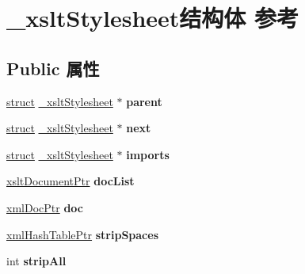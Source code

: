 \hypertarget{struct__xslt_stylesheet}{}\section{\+\_\+xslt\+Stylesheet结构体 参考}
\label{struct__xslt_stylesheet}
\subsection*{Public 属性}
\begin{DoxyCompactItemize}
\item 
\mbox{\label{struct__xslt_stylesheet_a7335f3ba61a86609bd4fb71a4a8464cc}} 
\hyperlink{interfacestruct}{struct} \hyperlink{struct__xslt_stylesheet}{\+\_\+xslt\+Stylesheet} $\ast$ {\bfseries parent}
\item 
\mbox{\label{struct__xslt_stylesheet_a227a59c7dac9af59ca43707376852516}} 
\hyperlink{interfacestruct}{struct} \hyperlink{struct__xslt_stylesheet}{\+\_\+xslt\+Stylesheet} $\ast$ {\bfseries next}
\item 
\mbox{\label{struct__xslt_stylesheet_a49dc69445de9eeae6a49a13b1507d496}} 
\hyperlink{interfacestruct}{struct} \hyperlink{struct__xslt_stylesheet}{\+\_\+xslt\+Stylesheet} $\ast$ {\bfseries imports}
\item 
\mbox{\label{struct__xslt_stylesheet_a95cd9bca61239eec54fd5fc1930814c4}} 
\hyperlink{struct__xslt_document}{xslt\+Document\+Ptr} {\bfseries doc\+List}
\item 
\mbox{\label{struct__xslt_stylesheet_a4f71e8da254a33b0774770244d28d993}} 
\hyperlink{struct__xml_doc}{xml\+Doc\+Ptr} {\bfseries doc}
\item 
\mbox{\label{struct__xslt_stylesheet_acca4c59694c70a5ae5b8c66b90ea5bad}} 
\hyperlink{struct__xml_hash_table}{xml\+Hash\+Table\+Ptr} {\bfseries strip\+Spaces}
\item 
\mbox{\label{struct__xslt_stylesheet_a4cccd2a18558e0f54b346e35e1cce22e}} 
int {\bfseries strip\+All}
\item 
\mbox{\label{struct__xslt_stylesheet_a9b0336b6ffdc6ec4828c22a0614a9043}} 

\end{DoxyCompactItemize}
